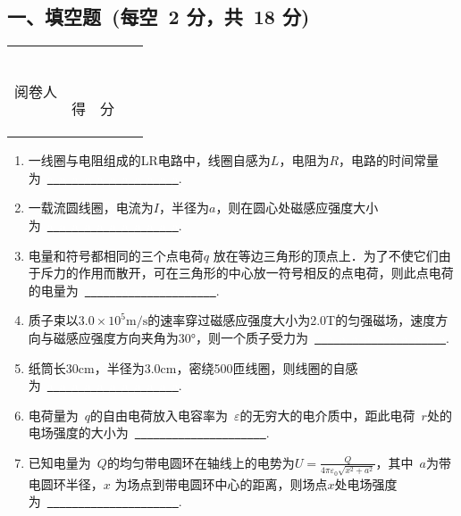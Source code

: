 \documentclass[11pt,twoside]{article}
\newcommand{\putzdx}{\marginpar{

\parbox{1cm}{\vspace{-1.6cm}

\rotatebox[origin=c]{90}{

\usebox{\zdx}

}}

}}
\newcommand{\blank}{\uline{\textcolor{white}{a}\ \textcolor{white}{a}\ \textcolor{white}{a}\ \textcolor{white}{a}\ \textcolor{white}{a}\ \textcolor{white}{a}\ \textcolor{white}{a}\ \textcolor{white}{a}\ \textcolor{white}{a}\ \textcolor{white}{a}\ \textcolor{white}{a}}}
\begin{document}
\setlength{\marginparsep}{1.7cm}

\putzdx %

\begin{spacing}{1.3}

\section{\hspace{5cm} 一、填空题~(每空~2 分，共~18 分)}

\vspace{-2cm}

\begin{tabular}{|p{}|p{}|}

\hline


\centering 阅卷人& \

\hline

\centering 得~~分 & \

\hline

\end{tabular}

\begin{enumerate}%

\item 一线圈与电阻组成的LR电路中，线圈自感为$L$，电阻为$R$，电路的时间常量为~\blank .%

\item 一载流圆线圈，电流为$I$，半径为$a$，则在圆心处磁感应强度大小为~\blank.%

\item 电量和符号都相同的三个点电荷$q$ 放在等边三角形的顶点上．为了不使它们由于斥力的作用而散开，可在三角形的中心放一符号相反的点电荷，则此点电荷的电量为~\blank.%

\item 质子束以$3.0\times 10^5 \mathrm {m/s}$的速率穿过磁感应强度大小为2.0T的匀强磁场，速度方向与磁感应强度方向夹角为30°，则一个质子受力为~\blank. %

\item 纸筒长30cm，半径为3.0cm，密绕500匝线圈，则线圈的自感为~\blank.

\item 电荷量为~$q$的自由电荷放入电容率为~$\varepsilon$的无穷大的电介质中，距此电荷~$r$处的电场强度的大小为~\blank .%

\item 已知电量为~$Q$的均匀带电圆环在轴线上的电势为$U=\frac{Q}{4\pi\varepsilon_0 \sqrt{x^2+a^2 }}$，其中~$a$为带电圆环半径，$x$ 为场点到带电圆环中心的距离，则场点$x$处电场强度为~\blank .%


\end{enumerate}
\end{spacing}
\end{document}

